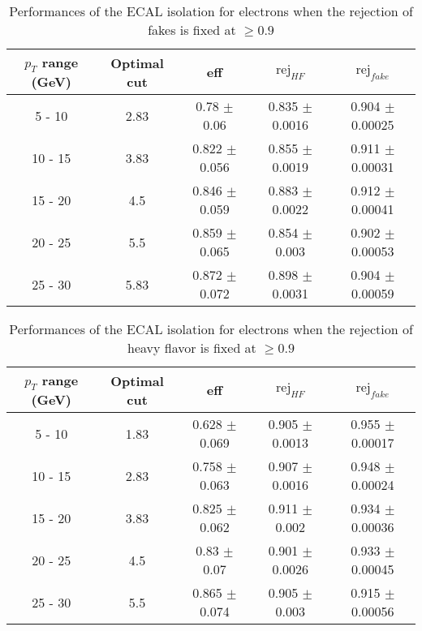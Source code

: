 \clearpage

\begin{table}[htbp]
   \centering
   \begin{tabular}{|c|c|c|c|c|}
      \hline
      $p_T$ range (GeV) & Optimal cut & eff & $\textrm{rej}_{HF}$ & $\textrm{rej}_{fake}$ \\
      \hline
      5 - 10 & 2.83 & 0.78 $\pm$ 0.06 & 0.835 $\pm$ 0.0016 & 0.904 $\pm$ 0.00025 \\
      \hline
      10 - 15 & 3.83 & 0.822 $\pm$ 0.056 & 0.855 $\pm$ 0.0019 & 0.911 $\pm$ 0.00031 \\
      \hline
      15 - 20 & 4.5 & 0.846 $\pm$ 0.059 & 0.883 $\pm$ 0.0022 & 0.912 $\pm$ 0.00041 \\
      \hline
      20 - 25 & 5.5 & 0.859 $\pm$ 0.065 & 0.854 $\pm$ 0.003 & 0.902 $\pm$ 0.00053 \\
      \hline
      25 - 30 & 5.83 & 0.872 $\pm$ 0.072 & 0.898 $\pm$ 0.0031 & 0.904 $\pm$ 0.00059 \\
      \hline
   \end{tabular}
   \caption{\small{Performances of the ECAL isolation for electrons when the rejection of fakes is fixed at $\geq 0.9$}\label{tab:ecal_elec_pureFake}}
\end{table}






\begin{table}[htbp]
   \centering
   \begin{tabular}{|c|c|c|c|c|}
      \hline
      $p_T$ range (GeV) & Optimal cut & eff & $\textrm{rej}_{HF}$ & $\textrm{rej}_{fake}$ \\
      \hline
      5 - 10 & 1.83 & 0.628 $\pm$ 0.069 & 0.905 $\pm$ 0.0013 & 0.955 $\pm$ 0.00017 \\
      \hline
      10 - 15 & 2.83 & 0.758 $\pm$ 0.063 & 0.907 $\pm$ 0.0016 & 0.948 $\pm$ 0.00024 \\
      \hline
      15 - 20 & 3.83 & 0.825 $\pm$ 0.062 & 0.911 $\pm$ 0.002 & 0.934 $\pm$ 0.00036 \\
      \hline
      20 - 25 & 4.5 & 0.83 $\pm$ 0.07 & 0.901 $\pm$ 0.0026 & 0.933 $\pm$ 0.00045 \\
      \hline
      25 - 30 & 5.5 & 0.865 $\pm$ 0.074 & 0.905 $\pm$ 0.003 & 0.915 $\pm$ 0.00056 \\
      \hline
   \end{tabular}
   \caption{\small{Performances of the ECAL isolation for electrons when the rejection of heavy flavor is fixed at $\geq 0.9$}\label{tab:ecal_elec_pureHf}}
\end{table}






